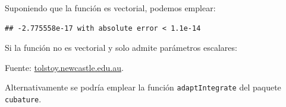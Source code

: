 \documentclass[
]{book}
\newenvironment{Shaded}{\begin{snugshade}}{\end{snugshade}}
\newcommand{\ControlFlowTok}[1]{\textcolor[rgb]{0.13,0.29,0.53}{\textbf{#1}}}
\newcommand{\KeywordTok}[1]{\textcolor[rgb]{0.13,0.29,0.53}{\textbf{#1}}}
\newcommand{\NormalTok}[1]{#1}
\newcommand{\OperatorTok}[1]{\textcolor[rgb]{0.81,0.36,0.00}{\textbf{#1}}}
\theoremstyle{break}
\theoremstyle{definition}
\theoremstyle{definition}
\theoremstyle{definition}
\theoremstyle{remark}
\begin{document}
Suponiendo que la función es vectorial, podemos emplear:

\begin{Shaded}
\end{Shaded}

\begin{verbatim}
## -2.775558e-17 with absolute error < 1.1e-14
\end{verbatim}

Si la función no es vectorial y solo admite parámetros escalares:

\begin{Shaded}
\end{Shaded}

Fuente: \href{http://tolstoy.newcastle.edu.au/R/help/04/10/5951.html}{tolstoy.newcastle.edu.au}.

Alternativamente se podría emplear la función \texttt{adaptIntegrate} del paquete \texttt{cubature}.

  
\end{document}
